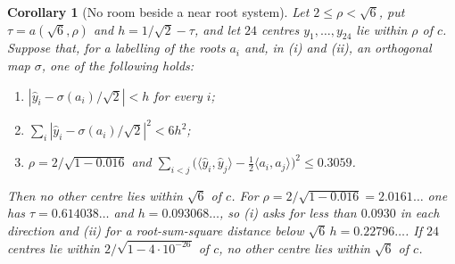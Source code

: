 \documentclass[11pt,reqno]{amsart}
\renewcommand{\_}{\origunderscore\allowbreak}
\numberwithin{equation}{section}
\theoremstyle{plain}
\newtheorem{cor}[thm]{Corollary}
\theoremstyle{definition}
\theoremstyle{remark}
\begin{document}
\begin{cor}[No room beside a near root system]\label{cor:no-room}
Let $2\le\rho<\sqrt6$, put $\tau=a(\sqrt6,\rho)$ and $h=1/\sqrt2-\tau$, and
let $24$ centres $y_1,\dots,y_{24}$ lie within $\rho$ of $c$. Suppose that,
for a labelling of the roots $a_i$ and, in \textup{(i)} and \textup{(ii)},
an orthogonal map $\sigma$, one of the following holds:
\begin{enumerate}[label=\textup{(\roman*)},leftmargin=2.2em]
\item $|\hat y_i-\sigma(a_i)/\sqrt2|<h$ for every $i$;
\item $\sum_i|\hat y_i-\sigma(a_i)/\sqrt2|^2<6h^2$;
\item $\rho=2/\sqrt{1-0.016}$ and
  $\sum_{i<j}\bigl(\langle\hat y_i,\hat y_j\rangle-\tfrac12\langle a_i,a_j\rangle\bigr)^2\le0.3059$.
\end{enumerate}
Then no other centre lies within $\sqrt6$ of $c$. For
$\rho=2/\sqrt{1-0.016}=2.0161\ldots$ one has $\tau=0.614038\ldots$ and
$h=0.093068\ldots$, so \textup{(i)} asks for less than $0.0930$ in each
direction and \textup{(ii)} for a root-sum-square distance below
$\sqrt6\,h=0.22796\ldots$. If $24$ centres lie within
$2/\sqrt{1-4\cdot10^{-26}}$ of $c$, no other centre lies within $\sqrt6$
of $c$.
\end{cor}
\end{document}
